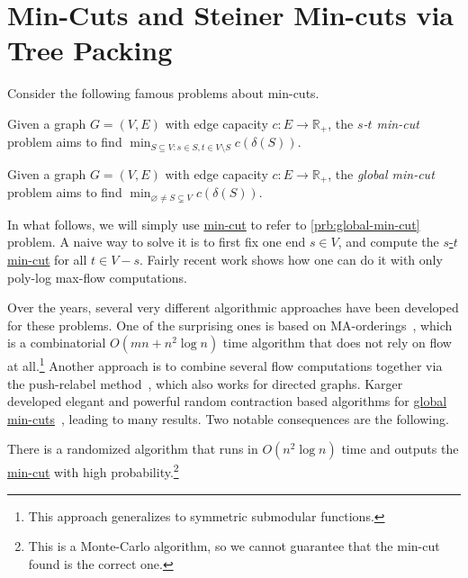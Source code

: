 \section{Min-Cuts and Steiner Min-cuts via Tree Packing}
Consider the following famous problems about min-cuts.

\begin{problem}\label{prb:s-t-min-cut}
Given a graph \(G = (V, E)\) with edge capacity \(c \colon E \to \mathbb{R} _+ \), the \emph{\(s\)-\(t\) min-cut} problem aims to find \(\min _{S \subseteq V \colon s \in S, t \in V\setminus S} c(\delta (S))\).
\end{problem}

\begin{problem}\label{prb:global-min-cut}
Given a graph \(G = (V, E)\) with edge capacity \(c \colon E \to \mathbb{R} _+ \), the \emph{global min-cut} problem aims to find \(\min _{\varnothing \neq S \subsetneq V} c(\delta (S))\).
\end{problem}

In what follows, we will simply use \hyperref[prb:global-min-cut]{min-cut} to refer to \autoref{prb:global-min-cut} problem. A naive way to solve it is to first fix one end \(s \in V\), and compute the \hyperref[prb:s-t-min-cut]{\(s\)-\(t\) min-cut} for all \(t \in V - s\). Fairly recent work shows how one can do it with only poly-log max-flow computations.

Over the years, several very different algorithmic approaches have been developed for these problems. One of the surprising ones is based on MA-orderings~\cite{nagamochi1992computing}, which is a combinatorial \(O(mn + n^2 \log n)\) time algorithm that does not rely on flow at all.\footnote{This approach generalizes to symmetric submodular functions.} Another approach is to combine several flow computations together via the push-relabel method~\cite{hao1994faster}, which also works for directed graphs. Karger developed elegant and powerful random contraction based algorithms for \hyperref[prb:global-min-cut]{global min-cuts}~\cite{karger1995random}, leading to many results. Two notable consequences are the following.

\begin{theorem}\label{thm:Karger-min-cut}
	There is a randomized algorithm that runs in \(O(n^2 \log n)\) time and outputs the \hyperref[prb:global-min-cut]{min-cut} with high probability.\footnote{This is a Monte-Carlo algorithm, so we cannot guarantee that the min-cut found is the correct one.}
\end{theorem}

